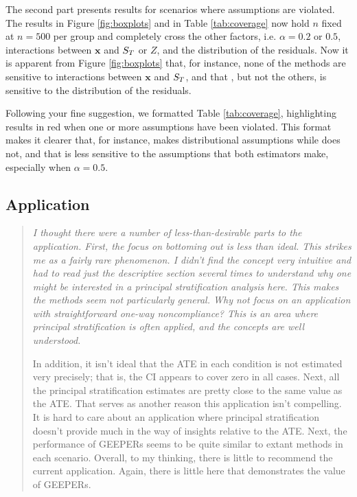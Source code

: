 \documentclass[]{article}
\newenvironment{itquote}
  {\begin{quote} \itshape}
  {\end{quote}\ignorespacesafterend}
\begin{document}
\begin{enumerate}
The second part presents results for scenarios where assumptions are violated. 
The results in Figure \ref{fig:boxplots} and in Table \ref{tab:coverage} now hold $n$ fixed at $n=500$ per group and completely cross the other factors, i.e. $\alpha=0.2$ or $0.5$, interactions between $\bm{x}$ and $S_T$ or $Z$, and the distribution of the residuals.
Now it is apparent from Figure \ref{fig:boxplots} that, for instance, none of the methods are sensitive to interactions between $\bm{x}$ and $S_T$, and that \pmm, but not the others, is sensitive to the distribution of the residuals.  

Following your fine suggestion, we formatted Table \ref{tab:coverage}, highlighting results in red when one or more assumptions have been violated.
This format makes it clearer that, for instance, \pmm makes distributional assumptions while \geepers does not, and that \geepers is less sensitive to the assumptions that both estimators make, especially when $\alpha=0.5$. 


\subsection{Application}
\begin{itquote}
I thought there were a number of less-than-desirable parts to the application. First, the focus on bottoming out is less than ideal. This strikes me as a fairly rare phenomenon. I didn't find the concept very intuitive and had to read just the descriptive section several times to understand why one might be interested in a principal stratification analysis here.  This makes the methods seem not particularly general.  Why not focus on an application with straightforward one-way noncompliance? This is an area where principal stratification is often applied, and the concepts are well understood.

In addition, it isn't ideal that the ATE in each condition is not estimated very precisely; that is, the CI appears to cover zero in all cases. Next, all the principal stratification estimates are pretty close to the same value as the ATE. That serves as another reason this application isn't compelling. It is hard to care about an application where principal stratification doesn't provide much in the way of insights relative to the ATE. Next, the performance of GEEPERs seems to be quite similar to extant methods in each scenario. Overall, to my thinking, there is little to recommend the current application. Again, there is little here that demonstrates the value of GEEPERs.
\end{itquote}


\end{enumerate}
\end{document}
